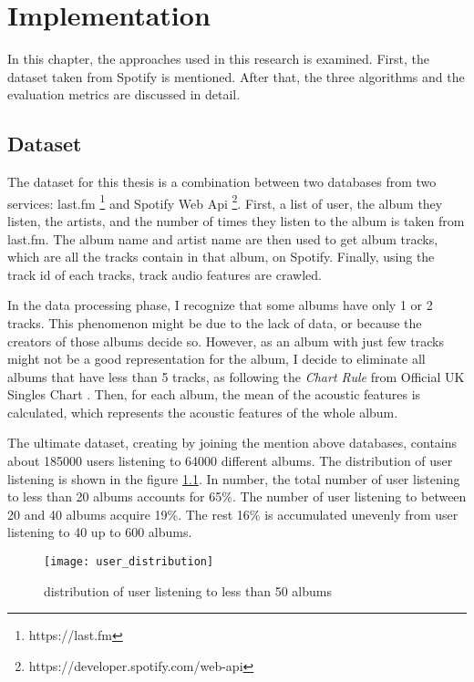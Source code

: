 \chapter{Implementation} %

\label{Chapter3} %

In this chapter, the approaches used in this research is examined. First, the dataset taken from Spotify is mentioned. After that, the three algorithms and the evaluation metrics are discussed in detail.

\section{Dataset}

The dataset for this thesis is a combination between two databases from two services: last.fm \footnote{https://last.fm} and Spotify Web Api \footnote{https://developer.spotify.com/web-api}. First, a list of user, the album they listen, the artists, and the number of times they listen to the album is taken from last.fm. The album name and artist name are then used to get album tracks, which are all the tracks contain in that album, on Spotify. Finally, using the track id of each tracks, track audio features are crawled. 


In the data processing phase, I recognize that some albums have only 1 or 2 tracks. This phenomenon might be due to the lack of data, or because the creators of those albums decide so. However, as an album with just few tracks might not be a good representation for the album, I decide to eliminate all albums that have less than 5 tracks, as following the \textit{Chart Rule} from Official UK Singles Chart \cite{chartUK2017}. Then, for each album, the mean of the acoustic features is calculated, which represents the acoustic features of the whole album. 

The ultimate dataset, creating by joining the mention above databases, contains about 185000 users listening to 64000 different albums. The distribution of user listening is shown in the figure \ref{fig:user_distribution}. In number, the total number of user listening to less than 20 albums accounts for 65\%. The number of user listening to between 20 and 40 albums acquire 19\%. The rest 16\% is accumulated unevenly from user listening to 40 up to 600 albums. 

\begin{figure}[h]
\centering
\texttt{[image: user\_distribution]}
\caption{distribution of user listening to less than 50 albums}
\label{fig:user_distribution}
\end{figure}

